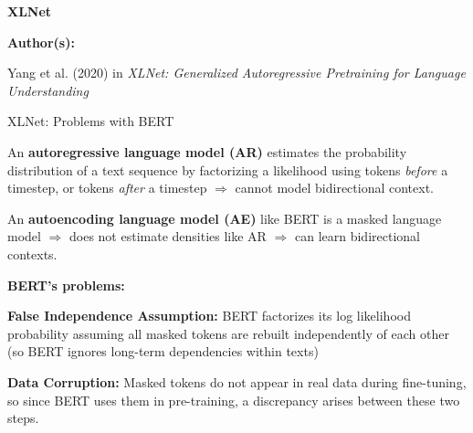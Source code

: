 


\begin{frame}{}
    \begin{center}
        \large \textbf{XLNet}
    \end{center}
    \vspace{20pt}
    
    \textbf{Author(s):}
    \begin{itemizeSpaced}{5pt}
    {\color{DimGrey} 
    
        \item Yang et al. (2020) in \emph{XLNet: Generalized Autoregressive Pretraining for Language Understanding}
        
    }
    \end{itemizeSpaced}
\end{frame}




\begin{frame}{XLNet: Problems with BERT}

\begin{itemizeSpaced}{10pt}
    \item An \textbf{autoregressive language model (AR)} estimates the probability distribution of a text sequence by factorizing a likelihood using tokens \emph{before} a timestep, or tokens \emph{after} a timestep $\Rightarrow$ cannot model bidirectional context. 
    
    \item An \textbf{autoencoding language model (AE)} like BERT is a masked language model $\Rightarrow$ does not estimate densities like AR $\Rightarrow$ can learn bidirectional contexts. 
    
    \pinkbox \textbf{BERT's problems: }
    \begin{itemizeSpaced}{10pt}
        
        \item \textbf{False Independence Assumption: } BERT factorizes its log likelihood probability \alert{assuming all masked tokens are rebuilt independently of each other (so BERT ignores long-term dependencies within texts)}
        
        \item \textbf{Data Corruption: }Masked tokens do not appear in real data during fine-tuning, so since BERT uses them in pre-training, a \alert{discrepancy} arises between these two steps. 
    \end{itemizeSpaced}
    
    
\end{itemizeSpaced}


    
\end{frame}


